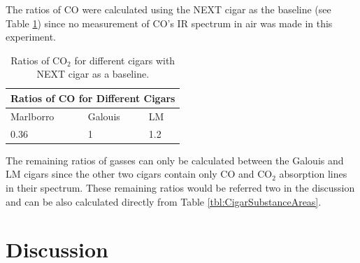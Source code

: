 \documentclass[reprint,amsmath,amssymb,aps, prl]{revtex4-2}
\begin{document}
The ratios of CO were calculated using the NEXT cigar as the baseline (see Table \ref{tbl:CigarCORATIOS}) since no measurement of CO's IR spectrum in air was made in this experiment.

\begin{table}[h]
    \begin{tabular}{ |p{1.5cm}|p{1.5cm}|p{1.5cm}|  }
     \hline
     \multicolumn{3}{|c|}{Ratios of CO for Different Cigars} \\ \hline
      Marlborro & Galouis & LM\\ \hline
       0.36 & 1 & 1.2 \\ \hline
    \end{tabular}
    \caption{Ratios of $\text{CO}_{2}$ for different cigars with NEXT cigar as a baseline.}
    \label{tbl:CigarCORATIOS}
\end{table}

The remaining ratios of gasses can only be calculated between the Galouis and LM cigars since the other two cigars contain only CO and $\text{CO}_{2}$ absorption lines in their spectrum. These remaining ratios would be referred two in the discussion and can be also calculated directly from Table \ref{tbl:CigarSubstanceAreas}.

\section{Discussion}



\end{document}

